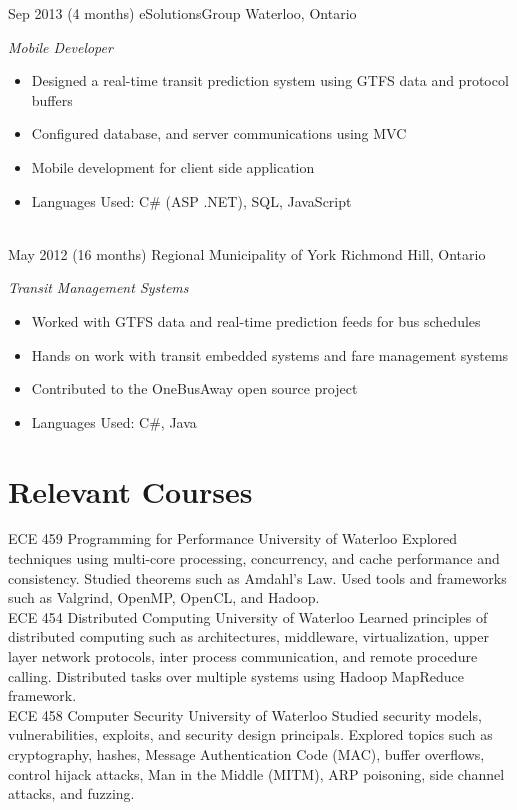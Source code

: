 \documentclass[print]{friggeri-cv} %
\begin{document}
\begin{entrylist}

\entry
{Sep 2013}
{(4 months)}
{eSolutionsGroup}
{Waterloo, Ontario}
{\emph{Mobile Developer}
\begin{itemize}
\item Designed a real-time transit prediction system using GTFS data and protocol buffers
\item Configured database, and server communications using MVC
\item Mobile development for client side application 
\item Languages Used: C\# (ASP .NET), SQL, JavaScript
\end{itemize}
}\\


\entry
{May 2012}
{(16 months)}
{Regional Municipality of York}
{Richmond Hill, Ontario}
{\emph{Transit Management Systems}
\begin{itemize}
\item Worked with GTFS data and real-time prediction feeds for bus schedules
\item Hands on work with transit embedded systems and fare management systems
\item Contributed to the OneBusAway open source project
\item Languages Used: C\#, Java
\end{itemize}
}


\end{entrylist}

\section{Relevant Courses}
\begin{entrylist}
\entry
{ECE 459}
{}
{Programming for Performance}
{University of Waterloo}
{Explored techniques using multi-core processing, concurrency, and cache performance and consistency.  Studied theorems such as Amdahl's Law.  Used tools and frameworks such as Valgrind, OpenMP, OpenCL, and Hadoop.} \\

\entry
{ECE 454}
{}
{Distributed Computing}
{University of Waterloo}
{Learned principles of distributed computing such as architectures, middleware, virtualization, upper layer network protocols, inter process communication, and remote procedure calling.  Distributed tasks over multiple systems using Hadoop MapReduce framework.} \\

\entry
{ECE 458}
{}
{Computer Security}
{University of Waterloo}
{Studied security models, vulnerabilities, exploits, and security design principals.  Explored topics such as cryptography, hashes, Message Authentication Code (MAC), buffer overflows, control hijack attacks, Man in the Middle (MITM), ARP poisoning, side channel attacks, and fuzzing.}
\end{entrylist}
\end{document}
